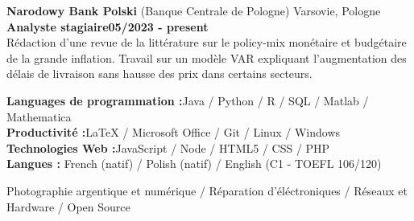 \documentclass[11pt]{report}
\begin{document}
\noindent\textbf{Narodowy Bank Polski} (Banque Centrale de Pologne) \hfill Varsovie, Pologne \\[0.1cm]
\textbf{Analyste stagiaire}\hfill \textbf{05/2023 - present} \\
Rédaction d'une revue de la littérature sur le policy-mix monétaire et budgétaire de la grande inflation. Travail sur un modèle VAR expliquant l'augmentation des délais de livraison sans hausse des prix dans certains secteurs. 

	\begin{flushleft}
	 \hrulefill
	\end{flushleft}



  \noindent\textbf{Languages de programmation :}\hfill{Java / Python / R / SQL / Matlab / Mathematica} \\
  \textbf{Productivité :}\hfill LaTeX / Microsoft Office / Git / Linux / Windows\\
  \textbf{Technologies Web :}\hfill JavaScript / Node / HTML5 / CSS / PHP  \\
  \textbf{Langues :} \hfill French (natif) / Polish (natif) / English (C1 - TOEFL 106/120) 

	\begin{flushleft}
	 \hrulefill
	\end{flushleft}

\noindent Photographie argentique et numérique / Réparation d'éléctroniques / Réseaux et Hardware / Open Source
\end{document}
